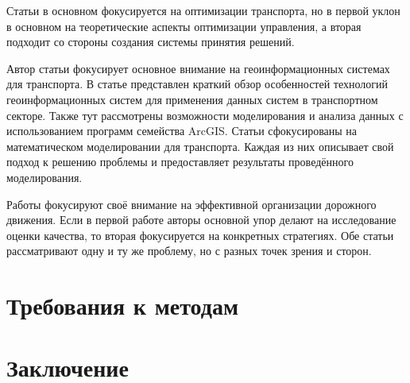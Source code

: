 Статьи \cite{bib:35,bib:36} в основном фокусируется на оптимизации транспорта, но в первой уклон в основном 
на теоретические аспекты оптимизации управления, а вторая подходит со стороны создания системы принятия 
решений.

Автор статьи \cite{bib:33} фокусирует основное внимание на геоинформационных системах для транспорта. 
В статье представлен краткий обзор особенностей технологий геоинформационных систем для применения данных 
систем в транспортном секторе. Также тут рассмотрены возможности моделирования и анализа данных с 
использованием программ семейства ArcGIS. Статьи \cite{bib:37,bib:38,bib:41} сфокусированы на математическом 
моделировании для транспорта. Каждая из них описывает свой подход к решению проблемы и предоставляет 
результаты проведённого моделирования.

Работы \cite{bib:42,bib:43} фокусируют своё внимание на эффективной организации дорожного движения. Если в 
первой работе авторы основной упор делают на исследование оценки качества, то вторая фокусируется на 
конкретных стратегиях. Обе статьи рассматривают одну и ту же проблему, но с разных точек зрения и сторон.

\section{Требования к методам}
\section{Заключение}